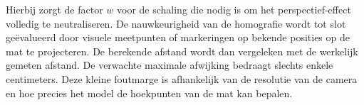 Hierbij zorgt de factor $w$ voor de schaling die nodig is om het perspectief-effect volledig te neutraliseren. De nauwkeurigheid van de homografie wordt tot slot ge{\"e}valueerd door visuele meetpunten of markeringen op bekende posities op de mat te projecteren. De berekende afstand wordt dan vergeleken met de werkelijk gemeten afstand. De verwachte maximale afwijking bedraagt slechts enkele centimeters. Deze kleine foutmarge is afhankelijk van de resolutie van de camera en hoe precies het model de hoekpunten van de mat kan bepalen.

